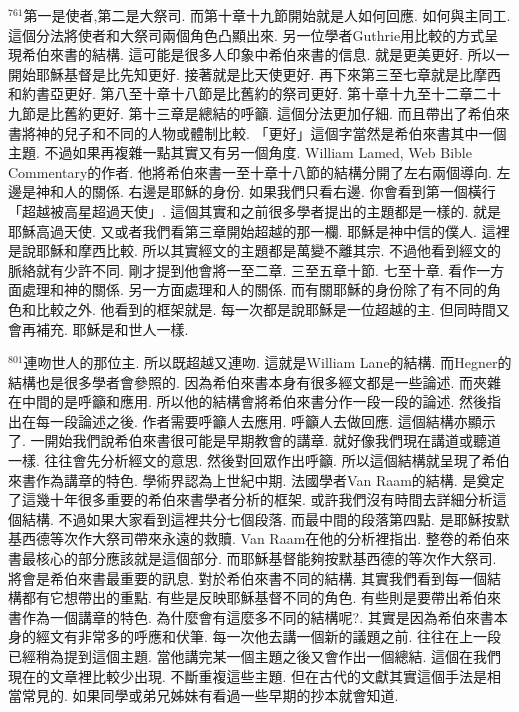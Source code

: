 \documentclass{book}
\begin{document}
$^{761}$第一是使者,第二是大祭司.
而第十章十九節開始就是人如何回應.
如何與主同工.
這個分法將使者和大祭司兩個角色凸顯出來.
另一位學者Guthrie用比較的方式呈現希伯來書的結構.
這可能是很多人印象中希伯來書的信息.
就是更美更好.
所以一開始耶穌基督是比先知更好.
接著就是比天使更好.
再下來第三至七章就是比摩西和約書亞更好.
第八至十章十八節是比舊約的祭司更好.
第十章十九至十二章二十九節是比舊約更好.
第十三章是總結的呼籲.
這個分法更加仔細.
而且帶出了希伯來書將神的兒子和不同的人物或體制比較.
「更好」這個字當然是希伯來書其中一個主題.
不過如果再複雜一點其實又有另一個角度.
William Lamed, Web Bible Commentary的作者.
他將希伯來書一至十章十八節的結構分開了左右兩個導向.
左邊是神和人的關係.
右邊是耶穌的身份.
如果我們只看右邊.
你會看到第一個橫行「超越被高星超過天使」.
這個其實和之前很多學者提出的主題都是一樣的.
就是耶穌高過天使.
又或者我們看第三章開始超越的那一欄.
耶穌是神中信的僕人.
這裡是說耶穌和摩西比較.
所以其實經文的主題都是萬變不離其宗.
不過他看到經文的脈絡就有少許不同.
剛才提到他會將一至二章.
三至五章十節.
七至十章.
看作一方面處理和神的關係.
另一方面處理和人的關係.
而有關耶穌的身份除了有不同的角色和比較之外.
他看到的框架就是.
每一次都是說耶穌是一位超越的主.
但同時間又會再補充.
耶穌是和世人一樣.

$^{801}$連吻世人的那位主.
所以既超越又連吻.
這就是William Lane的結構.
而Hegner的結構也是很多學者會參照的.
因為希伯來書本身有很多經文都是一些論述.
而夾雜在中間的是呼籲和應用.
所以他的結構會將希伯來書分作一段一段的論述.
然後指出在每一段論述之後.
作者需要呼籲人去應用.
呼籲人去做回應.
這個結構亦顯示了.
一開始我們說希伯來書很可能是早期教會的講章.
就好像我們現在講道或聽道一樣.
往往會先分析經文的意思.
然後對回眾作出呼籲.
所以這個結構就呈現了希伯來書作為講章的特色.
學術界認為上世紀中期.
法國學者Van Raam的結構.
是奠定了這幾十年很多重要的希伯來書學者分析的框架.
或許我們沒有時間去詳細分析這個結構.
不過如果大家看到這裡共分七個段落.
而最中間的段落第四點.
是耶穌按默基西德等次作大祭司帶來永遠的救贖.
Van Raam在他的分析裡指出.
整卷的希伯來書最核心的部分應該就是這個部分.
而耶穌基督能夠按默基西德的等次作大祭司.
將會是希伯來書最重要的訊息.
對於希伯來書不同的結構.
其實我們看到每一個結構都有它想帶出的重點.
有些是反映耶穌基督不同的角色.
有些則是要帶出希伯來書作為一個講章的特色.
為什麼會有這麼多不同的結構呢?.
其實是因為希伯來書本身的經文有非常多的呼應和伏筆.
每一次他去講一個新的議題之前.
往往在上一段已經稍為提到這個主題.
當他講完某一個主題之後又會作出一個總結.
這個在我們現在的文章裡比較少出現.
不斷重複這些主題.
但在古代的文獻其實這個手法是相當常見的.
如果同學或弟兄姊妹有看過一些早期的抄本就會知道.
\end{document}
